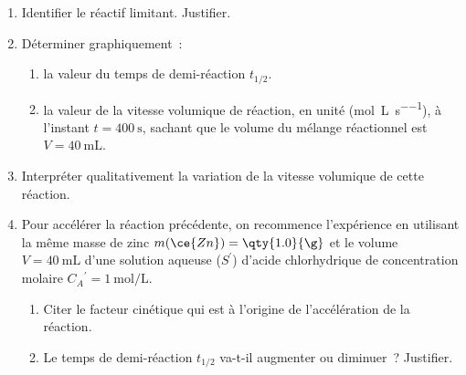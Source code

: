 \begin{enumerate}
    \item Identifier le réactif limitant. Justifier.
    \item Déterminer graphiquement~:
          \begin{enumerate}
              \item la valeur du temps de demi-réaction $t_{1/2}$.
              \item la valeur de la vitesse volumique de réaction, en unité
                    (\unit{\mol\per\L\per\s}), à l'instant $t=\qty{400}{\s}$,
                    sachant que le volume du mélange réactionnel est
                    $V=\qty{40}{\mL}$.
          \end{enumerate}
    \item Interpréter qualitativement la variation de la vitesse volumique de
          cette réaction.
    \item Pour accélérer la réaction précédente, on recommence l'expérience en
          utilisant la même masse de zinc $m(\ce{Zn})=\qty{1.0}{\g}$ et le
          volume $V=\qty{40}{\mL}$
          d'une solution aqueuse ($S^{\prime}$) d'acide chlorhydrique de
          concentration molaire $C_{A}{ }^{\prime}=\qty{1}{\mol\per\L}$.
          \begin{enumerate}
              \item Citer le facteur cinétique qui est à l'origine de
                    l'accélération de la réaction.
              \item Le temps de demi-réaction $t_{1/2}$ va-t-il augmenter ou
                    diminuer~? Justifier.
          \end{enumerate}
\end{enumerate}


